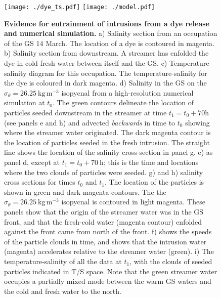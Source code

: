 \documentclass{natureJMK}
\begin{document}
\begin{figure}[htbp]
  \centering
    \texttt{[image: ./dye\_ts.pdf]}
    \texttt{[image: ./model.pdf]}
  \caption{{\bf Evidence for entrainment of intrusions from a dye release and numerical simulation.}
a) Salinity section from an occupation of the GS 14 March. The location of a dye is contoured in magenta.  b) Salinity section from downstream.  A streamer has enfolded the dye in cold-fresh water between itself and the GS.  c) Temperature-salinity diagram for this occupation.  The temperature-salinity for the dye is coloured in dark magenta.  
d) Salinity in the GS on the $\sigma_{\theta}=26.25\  \mathrm{kg\,m^{-3}}$ isopycnal from a high-resolution numerical simulation at $t_0$.  The green contours delineate the location of particles seeded downstream in the streamer at time $t_1=t_0+70 \mathrm{h}$ (see panels e and h) and advected \emph{backwards} in time to $t_0$ showing where the streamer water originated. The dark magenta contour is the location of particles seeded in the fresh intrusion.  The straight line shows the location of the salinity cross-section in panel g.  e) as panel d, except at $t_1=t_0+70\ \mathrm{h}$; this is the time and locations where the two clouds of particles were seeded.  g) and h) salinity cross sections for times $t_0$ and $t_1$.  The location of the particles is shown in green and dark magenta contours.  The the $\sigma_{\theta}=26.25\  \mathrm{kg\,m^{-3}}$ isopycnal is contoured in light magenta.  These panels show that the origin of the streamer water was in the GS front, and that the fresh-cold water (magenta contour) enfolded against the front came from north of the front.  f) shows the speeds of the particle clouds in time, and shows that the intrusion water (magenta) accelerates relative to the streamer water (green).  i) The temperature-salinity of all the data at $t_1$, with the clouds of seeded particles indicated in T/S space.  Note that the green streamer water occupies a partially mixed mode between the warm GS waters and the cold and fresh water to the north.  
  } \label{fig:StreamersModel}
\end{figure}


\end{document}
